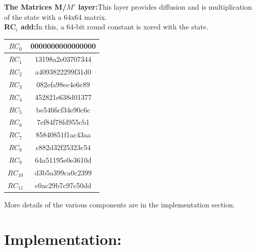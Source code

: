 \documentclass{transcrypto}
\begin{document}
\noindent
\textbf{The Matrices M/$M'$ layer:}This layer provides diffusion and is multiplication of the state with a 64x64 matrix.\\

\noindent
\textbf{RC$_i$ add:}In this, a 64-bit round constant is xored with the state.\\


\begin{center}
    \begin{tabular}{|c||c|}
         \hline
         $RC_0$ & 0000000000000000 \\
         \hline
         $RC_1$ & 13198a2e03707344 \\
         \hline
         $RC_2$ & a4093822299f31d0 \\
         \hline
         $RC_3$ & 082efa98ec4e6c89 \\
         \hline
         $RC_4$ & 452821e638d01377 \\
         \hline
         $RC_5$ & be5466cf34e90c6c \\
         \hline
         $RC_6$ & 7ef84f78fd955cb1 \\
         \hline
         $RC_7$ & 85840851f1ac43aa \\
         \hline
         $RC_8$ & c882d32f25323c54 \\
         \hline
         $RC_9$ & 64a51195e0e3610d \\
         \hline
         $RC_10$ &  d3b5a399ca0c2399 \\
         \hline
         $RC_11$ & c0ac29b7c97c50dd \\
         \hline
        \end{tabular}
\end{center}
More details of the various components are in the implementation section.\\

\section{Implementation:}\\
\end{document}
